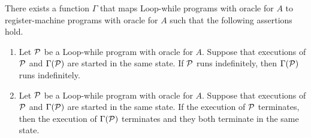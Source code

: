 \documentclass[10pt]{amsart}
\begin{document}
\begin{theorem}\label{theorem:Loop_while_compiled_on_register_machine}
	There exists a function $\Gamma$ that maps Loop-while programs with oracle for $A$ to register-machine programs with oracle for $A$ such that the following assertions hold.
	\begin{enumerate}[label=\emph{\textbf{(\arabic*)}}, leftmargin=3.0em]
		\item Let ${\mathcal P}$ be a Loop-while program with oracle for $A$. Suppose that executions of ${\mathcal P}$ and $\Gamma({\mathcal P})$ are started in the same state. If ${\mathcal P}$ runs indefinitely, then $\Gamma({\mathcal P})$ runs indefinitely.
		\item Let ${\mathcal P}$ be a Loop-while program with oracle for $A$. Suppose that executions of ${\mathcal P}$ and $\Gamma({\mathcal P})$ are started in the same state. If the execution of ${\mathcal P}$ terminates, then the execution of $\Gamma({\mathcal P})$ terminates and they both terminate in the same state.
	\end{enumerate}
\end{theorem}
\end{document}
